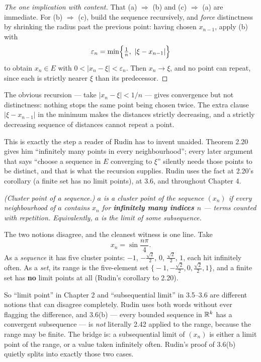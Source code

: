 \begin{proof}[The one implication with content]
That (a) $\Rightarrow$ (b) and (c) $\Rightarrow$ (a) are immediate. For
(b) $\Rightarrow$ (c), build the sequence recursively, and \emph{force}
distinctness by shrinking the radius past the previous point: having chosen
$x_{n-1}$, apply (b) with
\[ \varepsilon_n = \min\Bigl\{\tfrac1n,\ |\xi - x_{n-1}|\Bigr\} \]
to obtain $x_n \in E$ with $0 < |x_n - \xi| < \varepsilon_n$. Then
$x_n \to \xi$, and no point can repeat, since each is strictly nearer $\xi$
than its predecessor.
\end{proof}

\begin{unpack}
The obvious recursion --- take $|x_n - \xi| < 1/n$ --- gives convergence but
not distinctness: nothing stops the same point being chosen twice. The extra
clause $|\xi - x_{n-1}|$ in the minimum makes the distances strictly
decreasing, and a strictly decreasing sequence of distances cannot repeat a
point.

This is exactly the step a reader of Rudin has to invent unaided. Theorem
2.20 gives him ``infinitely many points in every neighbourhood''; every later
argument that says ``choose a sequence in $E$ converging to $\xi$'' silently
needs those points to be distinct, and that is what the recursion supplies.
Rudin uses the fact at 2.20's corollary (a finite set has no limit points),
at 3.6, and throughout Chapter 4.
\end{unpack}

\emph{(Cluster point of a sequence.) $a$ is a cluster point of the sequence
$(x_n)$ if every neighbourhood of $a$ contains $x_n$ for \textbf{infinitely
many indices $n$} --- terms counted with repetition. Equivalently, $a$ is the
limit of some subsequence.}

\begin{pitfall}
The two notions disagree, and the cleanest witness is one line. Take
\[ x_n = \sin\frac{n\pi}{4} . \]
As a \emph{sequence} it has five cluster points: $-1$, $-\tfrac{\sqrt2}{2}$,
$0$, $\tfrac{\sqrt2}{2}$, $1$, each hit infinitely often. As a \emph{set},
its range is the five-element set
$\bigl\{-1,-\tfrac{\sqrt2}{2},0,\tfrac{\sqrt2}{2},1\bigr\}$, and a finite set
has \textbf{no} limit points at all (Rudin's corollary to 2.20).

So ``limit point'' in Chapter 2 and ``subsequential limit'' in 3.5--3.6 are
different notions that can disagree completely. Rudin uses both words without
ever flagging the difference, and 3.6(b) --- every bounded sequence in $\mathbb{R}^k$
has a convergent subsequence --- is \emph{not} literally 2.42 applied to the
range, because the range may be finite. The bridge is: a subsequential limit
of $(x_n)$ is either a limit point of the range, or a value taken infinitely
often. Rudin's proof of 3.6(b) quietly splits into exactly those two cases.
\end{pitfall}

